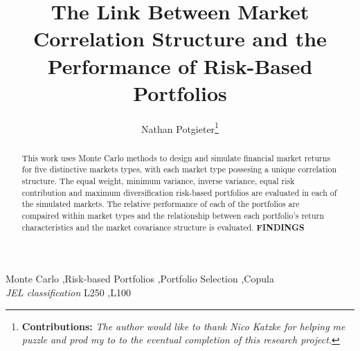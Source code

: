 \documentclass[11pt,preprint, authoryear]{elsarticle}
\numberwithin{equation}{section}
\numberwithin{figure}{section}
\numberwithin{table}{section}
\let\rmarkdownfootnote\footnote%
\def\footnote{\protect\rmarkdownfootnote}
\begin{document}
\begin{frontmatter}  %

\title{The Link Between Market Correlation Structure and the Performance of
Risk-Based Portfolios}





\author[Add1]{Nathan Potgieter\footnote{\textbf{Contributions:} \newline \emph{The
  author would like to thank Nico Katzke for helping me puzzle and prod
  my to to the eventual completion of this research project.}}}





\address[Add1]{Stellenbosch University, Stellenbosch, South Africa}


\begin{abstract}
\small{
This work uses Monte Carlo methods to design and simulate financial
market returns for five distinctive markets types, with each market type
possesing a unique correlation structure. The equal weight, minimum
variance, inverse variance, equal risk contribution and maximum
diversification risk-based portfolios are evaluated in each of the
simulated markets. The relative performance of each of the portfolios
are compaired within market types and the relationship between each
portfolio's return characteristics and the market covariance structure
is evaluated. \textbf{FINDINGS}
}
\end{abstract}

\vspace{1cm}

\begin{keyword}
\footnotesize{
Monte Carlo \sep Risk-based Portfolios \sep Portfolio Selection
\sep Copula \\ \vspace{0.3cm}
\textit{JEL classification} L250 \sep L100
}
\end{keyword}
\vspace{0.5cm}
\end{frontmatter}



\pagestyle{fancy}
\chead{}
\rhead{}
\lfoot{}
\lhead{}
\cfoot{}

\end{document}
